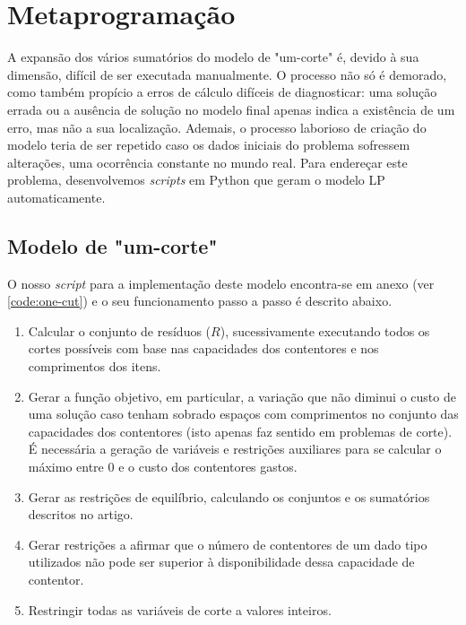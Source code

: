 \documentclass[12pt, a4paper, titlepage]{article}
\begin{document}
\section{Metaprogramação}

A expansão dos vários sumatórios do modelo de "um-corte"{} é, devido à sua dimensão, difícil de ser
executada manualmente. O processo não só é demorado, como também propício a erros de cálculo
difíceis de diagnosticar: uma solução errada ou a ausência de solução no modelo final apenas indica
a existência de um erro, mas não a sua localização. Ademais, o processo laborioso de criação do
modelo teria de ser repetido caso os dados iniciais do problema sofressem alterações, uma ocorrência
constante no mundo real. Para endereçar este problema, desenvolvemos \emph{scripts} em Python que
geram o modelo LP automaticamente.

\subsection{Modelo de "um-corte"{}}

O nosso \emph{script} para a implementação deste modelo encontra-se em anexo (ver
\ref{code:one-cut}) e o seu funcionamento passo a passo é descrito abaixo.


\begin{enumerate}
    \item Calcular o conjunto de resíduos ($R$), sucessivamente executando todos os cortes possíveis
        com base nas capacidades dos contentores e nos comprimentos dos itens.

    \item Gerar a função objetivo, em particular, a variação que não diminui o custo de uma solução
        caso tenham sobrado espaços com comprimentos no conjunto das capacidades dos contentores
        (isto apenas faz sentido em problemas de corte). É necessária a geração de variáveis e
        restrições auxiliares para se calcular o máximo entre $0$ e o custo dos contentores gastos.

    \item Gerar as restrições de equilíbrio, calculando os conjuntos e os sumatórios descritos no
        artigo.

    \item Gerar restrições a afirmar que o número de contentores de um dado tipo utilizados não pode
        ser superior à disponibilidade dessa capacidade de contentor.

    \item Restringir todas as variáveis de corte a valores inteiros.
\end{enumerate}
\end{document}
